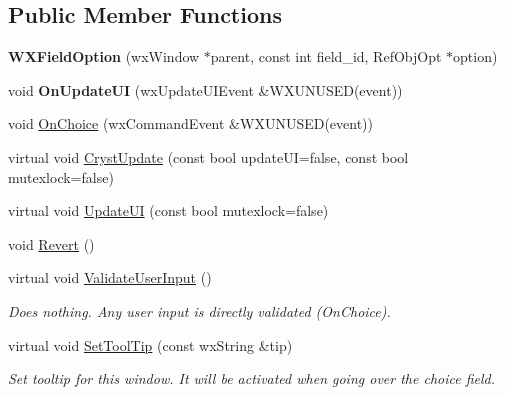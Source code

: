 \subsection*{Public Member Functions}
\begin{DoxyCompactItemize}
\item 
\mbox{\label{class_obj_cryst_1_1_w_x_field_option_a2cd2f40e31d3c634b2d62d5f85de8274}} 
{\bfseries W\+X\+Field\+Option} (wx\+Window $\ast$parent, const int field\+\_\+id, Ref\+Obj\+Opt $\ast$option)
\item 
\mbox{\label{class_obj_cryst_1_1_w_x_field_option_abddd97d3a27a4ec41fe39e0a6b632346}} 
void {\bfseries On\+Update\+UI} (wx\+Update\+U\+I\+Event \&W\+X\+U\+N\+U\+S\+ED(event))
\item 
void \mbox{\hyperlink{class_obj_cryst_1_1_w_x_field_option_a3e6b1207ac284497de28a4ede07df048}{On\+Choice}} (wx\+Command\+Event \&W\+X\+U\+N\+U\+S\+ED(event))
\item 
virtual void \mbox{\hyperlink{class_obj_cryst_1_1_w_x_field_option_a311178af180f6e17dbf3de43dac50130}{Cryst\+Update}} (const bool update\+UI=false, const bool mutexlock=false)
\item 
virtual void \mbox{\hyperlink{class_obj_cryst_1_1_w_x_field_option_ad0255d70605865c5f54afb20bc3b5c41}{Update\+UI}} (const bool mutexlock=false)
\item 
void \mbox{\hyperlink{class_obj_cryst_1_1_w_x_field_option_a8caf4ac439d8c702583ceda0612618ab}{Revert}} ()
\item 
\mbox{\label{class_obj_cryst_1_1_w_x_field_option_a7806fde9ad738ec02b458cce019edd60}} 
virtual void \mbox{\hyperlink{class_obj_cryst_1_1_w_x_field_option_a7806fde9ad738ec02b458cce019edd60}{Validate\+User\+Input}} ()
\begin{DoxyCompactList}\small\item\em Does nothing. Any user input is directly validated (On\+Choice). \end{DoxyCompactList}\item 
\mbox{\label{class_obj_cryst_1_1_w_x_field_option_a262b84907647ed799561a9687e745247}} 
virtual void \mbox{\hyperlink{class_obj_cryst_1_1_w_x_field_option_a262b84907647ed799561a9687e745247}{Set\+Tool\+Tip}} (const wx\+String \&tip)
\begin{DoxyCompactList}\small\item\em Set tooltip for this window. It will be activated when going over the choice field. \end{DoxyCompactList}\end{DoxyCompactItemize}
